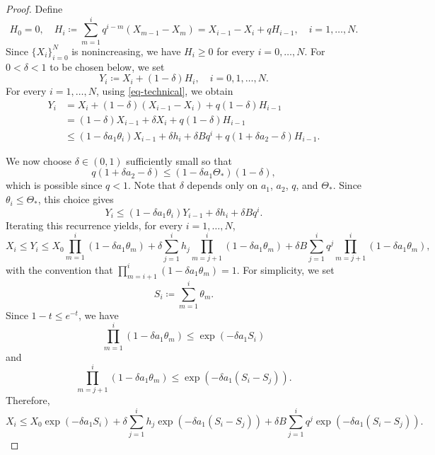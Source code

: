 \documentclass[11pt]{amsart}
\theoremstyle{plain}
\theoremstyle{definition}
\numberwithin{equation}{section}
\begin{document}
\begin{proof}
Define
    \begin{equation*}
        H_0=0, \quad H_i \coloneqq \sum_{m=1}^iq^{i-m}(X_{m-1}-X_m)=X_{i-1}-X_i+qH_{i-1}, \quad i=1,\dots, N.
    \end{equation*}
Since $\{X_i\}_{i=0}^N$ is nonincreasing, we have $H_i \geq 0$ for every $i=0, \dots, N$. For $0<\delta<1$ to be chosen below, we set
    \begin{equation*}
        Y_i \coloneqq X_i+(1-\delta)H_i, \quad i=0, 1, \dots, N.
    \end{equation*}
For every $i=1, \dots, N$, using \eqref{eq-technical}, we obtain
    \begin{equation*}
    \begin{aligned}
        Y_i&=X_i+(1-\delta)(X_{i-1}-X_i)+q(1-\delta)H_{i-1}\\
        &=(1-\delta)X_{i-1}+\delta X_i+q(1-\delta)H_{i-1}\\
        &\leq (1-\delta a_1 \theta_i)X_{i-1}+\delta h_i+\delta B q^i+q(1+\delta a_2-\delta)H_{i-1}.
    \end{aligned}
    \end{equation*}


    We now choose $\delta \in (0, 1)$ sufficiently small so that
    \begin{equation*}
        q(1+\delta a_2-\delta) \leq (1-\delta a_1\Theta_{\ast})(1-\delta),
    \end{equation*}
    which is possible since $q<1$. Note that $\delta$ depends only on $a_1$, $a_2$, $q$, and $\Theta_\ast$. Since $\theta_i \leq \Theta_\ast$, this choice gives
    \begin{equation*}
        Y_i \leq (1-\delta a_1 \theta_i)Y_{i-1}+\delta h_i+\delta Bq^i.
    \end{equation*}
    Iterating this recurrence yields, for every $i=1, \dots, N$,
    \begin{equation*}
        X_i \leq Y_i \leq X_0 \prod_{m=1}^i (1-\delta a_1 \theta_m)+\delta \sum_{j=1}^i h_j \prod_{m=j+1}^i(1-\delta a_1 \theta_m)+\delta B \sum_{j=1}^i q^j \prod_{m=j+1}^i(1-\delta a_1 \theta_m),
    \end{equation*}
    with the convention that $\prod_{m=i+1}^i (1-\delta a_1 \theta_m)=1$.
    For simplicity, we set
    \begin{equation*}
        S_i \coloneqq \sum_{m=1}^i\theta_m.
    \end{equation*}
Since $1-t \leq e^{-t}$, we have
    \begin{equation*}
        \prod_{m=1}^i(1-\delta a_1 \theta_m) \leq \exp\left(-\delta a_1 S_i\right)
    \end{equation*}
    and
    \begin{equation*}
        \prod_{m=j+1}^i(1-\delta a_1 \theta_m) \leq \exp\left(-\delta a_1 (S_i-S_j)\right).
    \end{equation*}
Therefore,
    \begin{equation*}
    X_i \leq X_0 \exp\left( -\delta a_1 S_i \right) + \delta \sum_{j=1}^{i} h_j\exp\left(-\delta a_1 (S_i-S_j)\right) + \delta B \sum_{j=1}^i q^j \exp\left(-\delta a_1 (S_i-S_j)\right).
    \end{equation*}
    

\end{proof}
\end{document}
